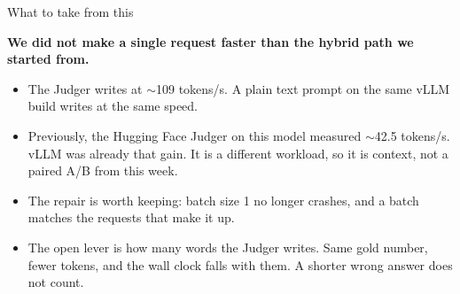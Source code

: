 \documentclass[aspectratio=169]{beamer}
\begin{document}
\begin{frame}{What to take from this}

\textbf{We did not make a single request faster than the hybrid path we
started from.}

\vspace{0.5em}
\begin{itemize}
  \item The Judger writes at $\sim$109 tokens/s. A plain text prompt on the
        same vLLM build writes at the same speed.
  \item Previously, the Hugging Face Judger on this model measured
        $\sim$42.5 tokens/s. vLLM was already that gain. It is a different
        workload, so it is context, not a paired A/B from this week.
  \item The repair is worth keeping: batch size 1 no longer crashes, and a
        batch matches the requests that make it up.
  \item The open lever is how many words the Judger writes. Same gold
        number, fewer tokens, and the wall clock falls with them. A shorter
        wrong answer does not count.
\end{itemize}

\end{frame}
\end{document}
